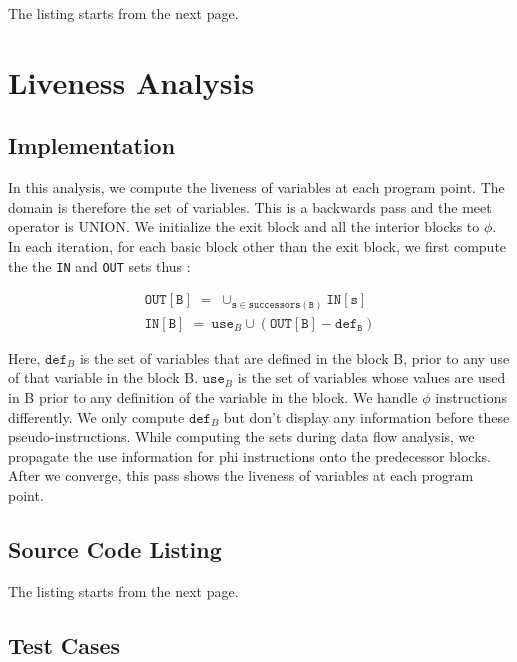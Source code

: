 The listing starts from the next page.



\section{Liveness Analysis}

\subsection{Implementation}

In this analysis, we compute the liveness of variables at each program point.
The domain is therefore the set of variables.
This is a backwards pass and the meet operator is UNION.
We initialize the exit block and all the interior blocks to $\phi$.
In each iteration, for each basic block other than the exit block, we
first compute the the \texttt{IN} and \texttt{OUT} sets thus :

\begin{align*}
\texttt{OUT}[\mathtt{B}] \; = \; \cup_{\mathtt{s} \in \texttt{successors}(\mathtt{B})} \texttt{IN}[\texttt{s}] \\
\texttt{IN}[\mathtt{B}] \; = \; \texttt{use}_{B} \cup (\texttt{OUT}[\mathtt{B}] - \texttt{def}_{\texttt{B}})
\end{align*}

Here,
$\texttt{def}_{B}$ is the set of variables that are defined in the block B, prior to any use of that
variable in the block B. $\texttt{use}_{B}$ is the set of variables whose values are used in B prior to any
definition of the variable in the block.
We handle $\phi$ instructions differently. We only compute $\texttt{def}_{B}$ but don't display any
information before these pseudo-instructions. While computing the sets during data flow analysis,
we propagate the use information for phi instructions onto the predecessor blocks. After we converge,
this pass shows the liveness of variables at each program point.

\subsection{Source Code Listing}

The listing starts from the next page.



\subsection{Test Cases}

